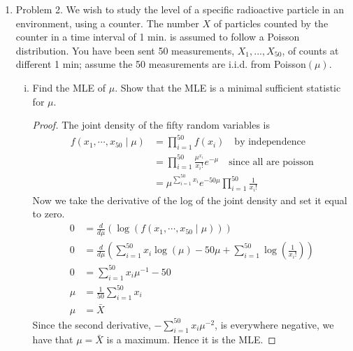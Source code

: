\documentclass[letterpaper, 12pt]{article}\usepackage{graphicx, color}
\newcommand{\sbs}{\;|\;} %
\begin{document}
\begin{enumerate}
\item
Problem 2. We wish to study the level of a specific radioactive particle in
an environment, using a counter. The number $X$ of particles counted by the
counter in a time interval of 1 min. is assumed to follow a Poisson
distribution. You have been sent 50 measurements, $X_{1},...,X_{50}$, of
counts at different 1 min; assume the 50 measurements are i.i.d. from
Poisson$(\mu )$.

\begin{enumerate}[(i)]
\item
Find the MLE of $\mu$. Show that the MLE is a minimal sufficient statistic for $\mu$.

\begin{proof}
The joint density of the fifty random variables is 
\begin{align}
f(x_1, \cdots, x_{50} \sbs \mu) 
&= 
\prod_{i=1}^{50} 
f(x_i) 
\quad \text{by independence} \\
&= 
\prod_{i=1}^{50}
\frac{\mu^{x_i}}{x_i!} e^{-\mu}
\quad \text{since all are poisson} \\
&= 
\mu^{\sum_{i=1}^{50} x_i} e ^{-50\mu} 
\prod_{i=1}^{50}
\frac{1}{x_i!}
\end{align}
Now we take the derivative of the log of the joint density and set it equal to zero.
\begin{align}
0 &= \frac{d}{d \mu}(\log (  f(x_1, \cdots, x_{50} \sbs \mu)   )) \\
0 &= 
\frac{d}{d \mu} 
\left(\sum_{i=1}^{50} x_i \log(\mu) - 50 \mu + \sum_{i=1}^{50} \log\left(\frac{1}{x_i!} \right)    \right) \\
0 &=
\sum_{i=1}^{50} x_i \mu^{-1} - 50 \\
\mu &= \frac{1}{50}\sum_{i=1}^{50} x_i \\
\mu &= \bar{X}
\end{align}
Since the second derivative, $-\sum_{i=1}^{50} x_i \mu^{-2}$, is everywhere negative, we have that $\mu = \bar{X}$ is a maximum. Hence it is the MLE.


\end{proof}
\end{enumerate}
\end{enumerate}
\end{document}
